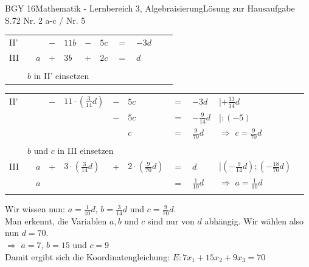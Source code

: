 \documentclass[oneside,openany,headings=optiontotoc,11pt,numbers=noenddot]{scrreprt}
\begin{document}
\begin{worksheet}{BGY 16}{Mathematik - Lernbereich 3, Algebraisierung}{Lösung zur Hausaufgabe S.72 Nr. 2 a-c / Nr. 5}
\begin{framed}
\begin{tabularx}{\textwidth}{lllllllllll}
				II' & \(\) & \(\) & \(-\) & \(11b\) & \(-\) & \(5c\) & \(=\) & \(-3d\)\\
				III & \(\) & \(a\) & \(+\) & \(3b\) & \(+\) & \(2c\) & \(=\) & \(d\)\\
				\cline{1-9}\\
				& \multicolumn{9}{l}{\(b\) in II' einsetzen}\\
			\end{tabularx}
			\begin{tabularx}{\textwidth}{lllllllllll}
				II' & \(\) & \(\) & \(-\) & \(11\cdot \left(\frac{3}{14}d\right)\) & \(-\) & \(5c\) & \(=\) & \(-3d\) & |\(+\frac{33}{14}d\)\\
				& \(\) & \(\) & \(\) & \(\) & \(-\) & \(5c\) & \(=\) & \(-\frac{9}{14}d\) & |\(:(-5)\)\\
				& \(\) & \(\) & \(\) & \(\) & \(\) & \(c\) & \(=\) & \(\frac{9}{70}d\) & \(\Rightarrow\) \colorbox{green!10}{\(c = \frac{9}{70}d\)}\\
				\cline{1-9}\\
				& \multicolumn{9}{l}{\(b\) und \(c\) in III einsetzen}\\
				III & \(\) & \(a\) & \(+\) & \(3\cdot \left(\frac{3}{14}d\right)\) & \(+\) & \(2\cdot \left(\frac{9}{70}d\right)\) & \(=\) & \(d\) & |\((-\frac{9}{14}d); (-\frac{18}{70}d)\)\\
				& \(\) & \(a\) & \(\) & \(\) & \(\) & \(\) & \(=\) & \(\frac{1}{10}d\) & \(\Rightarrow\) \colorbox{green!10}{\(a = \frac{1}{10}d\)}\\
				\cline{1-9}\\
			\end{tabularx}
			\par\bigskip\noindent
			Wir wissen nun: \colorbox{green!10}{\(a = \frac{1}{10}d\)}, \colorbox{green!10}{\(b = \frac{3}{14}d\)} und \colorbox{green!10}{\(c = \frac{9}{70}d\)}.\\
			Man erkennt, die Variablen \(a, b\) und \(c\) sind nur von \(d\) abhängig. Wir wählen also nun \colorbox{blue!5}{\(d = 70\)}.\\
			\(\Rightarrow\) \colorbox{green!10}{\(a = 7\)}, \colorbox{green!10}{\(b =15\)} und \colorbox{green!10}{\(c = 9\)}\\
			Damit ergibt sich die Koordinatengleichung: \colorbox{green!10}{\(E: 7x_1 +15x_2 +9x_3 = 70\)}\\
		\end{framed}
	\end{worksheet}
\end{document}
